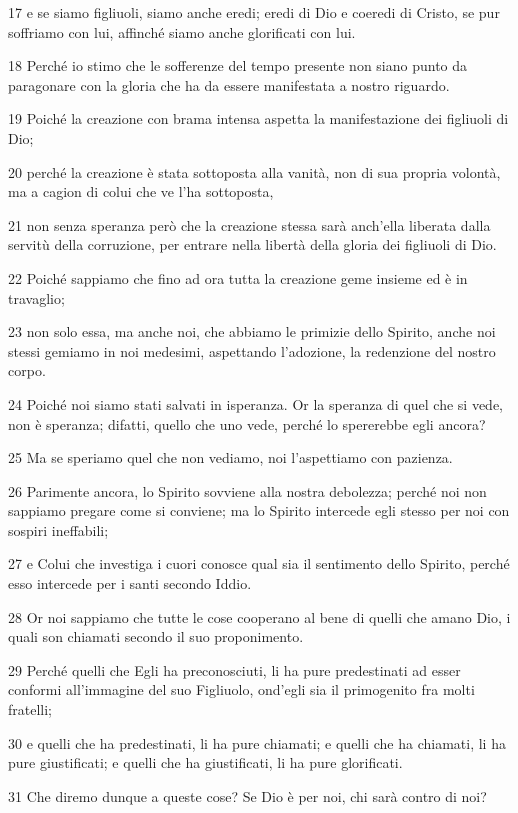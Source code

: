 \par 17 e se siamo figliuoli, siamo anche eredi; eredi di Dio e coeredi di Cristo, se pur soffriamo con lui, affinché siamo anche glorificati con lui.
\par 18 Perché io stimo che le sofferenze del tempo presente non siano punto da paragonare con la gloria che ha da essere manifestata a nostro riguardo.
\par 19 Poiché la creazione con brama intensa aspetta la manifestazione dei figliuoli di Dio;
\par 20 perché la creazione è stata sottoposta alla vanità, non di sua propria volontà, ma a cagion di colui che ve l'ha sottoposta,
\par 21 non senza speranza però che la creazione stessa sarà anch'ella liberata dalla servitù della corruzione, per entrare nella libertà della gloria dei figliuoli di Dio.
\par 22 Poiché sappiamo che fino ad ora tutta la creazione geme insieme ed è in travaglio;
\par 23 non solo essa, ma anche noi, che abbiamo le primizie dello Spirito, anche noi stessi gemiamo in noi medesimi, aspettando l'adozione, la redenzione del nostro corpo.
\par 24 Poiché noi siamo stati salvati in isperanza. Or la speranza di quel che si vede, non è speranza; difatti, quello che uno vede, perché lo spererebbe egli ancora?
\par 25 Ma se speriamo quel che non vediamo, noi l'aspettiamo con pazienza.
\par 26 Parimente ancora, lo Spirito sovviene alla nostra debolezza; perché noi non sappiamo pregare come si conviene; ma lo Spirito intercede egli stesso per noi con sospiri ineffabili;
\par 27 e Colui che investiga i cuori conosce qual sia il sentimento dello Spirito, perché esso intercede per i santi secondo Iddio.
\par 28 Or noi sappiamo che tutte le cose cooperano al bene di quelli che amano Dio, i quali son chiamati secondo il suo proponimento.
\par 29 Perché quelli che Egli ha preconosciuti, li ha pure predestinati ad esser conformi all'immagine del suo Figliuolo, ond'egli sia il primogenito fra molti fratelli;
\par 30 e quelli che ha predestinati, li ha pure chiamati; e quelli che ha chiamati, li ha pure giustificati; e quelli che ha giustificati, li ha pure glorificati.
\par 31 Che diremo dunque a queste cose? Se Dio è per noi, chi sarà contro di noi?
